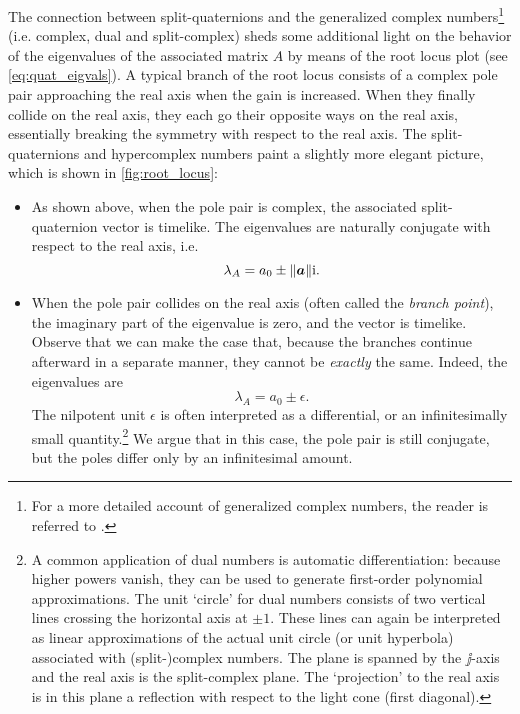 The connection between split-quaternions and the generalized complex numbers\footnote
{For a more detailed account of generalized complex numbers, the reader is referred to \citet{Harkin2004}.}
(i.e. complex, dual and split-complex)
sheds some additional light on the behavior of the eigenvalues of the associated matrix \(A\) by means of the root locus plot (see \cref{eq:quat_eigvals}). A typical branch of the  root locus consists of a complex pole pair approaching the real axis when the gain is increased. When they finally collide on the real axis, they each go their opposite ways on the real axis, essentially breaking the symmetry with respect to the real axis. The split-quaternions and hypercomplex numbers paint a slightly more elegant picture, which is shown in \cref{fig:root_locus}:
\begin{itemize}
    \item As shown above, when the pole pair is complex, the associated split-quaternion vector is timelike. The eigenvalues are naturally conjugate with respect to the real axis, i.e.
        \begin{equation}
             \lambda_A = a_0 \pm \norm{\vec{a}}\ii.
        \end{equation}
    \item When the pole pair collides on the real axis (often called the \emph{branch point}), the imaginary part of the eigenvalue is zero, and the vector is timelike. Observe that we can make the case that, because the branches continue afterward in a separate manner, they cannot be \emph{exactly} the same. Indeed, the eigenvalues are
        \begin{equation}
             \lambda_A = a_0 \pm \epsilon.
        \end{equation}
        The nilpotent unit \(\epsilon\) is often interpreted as a differential, or an infinitesimally small quantity.\footnote{A common application of dual numbers is automatic differentiation: because higher powers vanish, they can be used to generate first-order polynomial approximations. The unit `circle' for dual numbers consists of two vertical lines crossing the horizontal axis at \(\pm 1\). These lines can again be interpreted as linear approximations of the actual unit circle (or unit hyperbola) associated with (split-)complex numbers. The plane is spanned by the \(\jj\)-axis and the real axis is the split-complex plane. The `projection' to the real axis is in this plane a reflection with respect to the light cone (first diagonal).} We argue that in this case, the pole pair is still conjugate, but the poles differ only by an infinitesimal amount.

\end{itemize}
